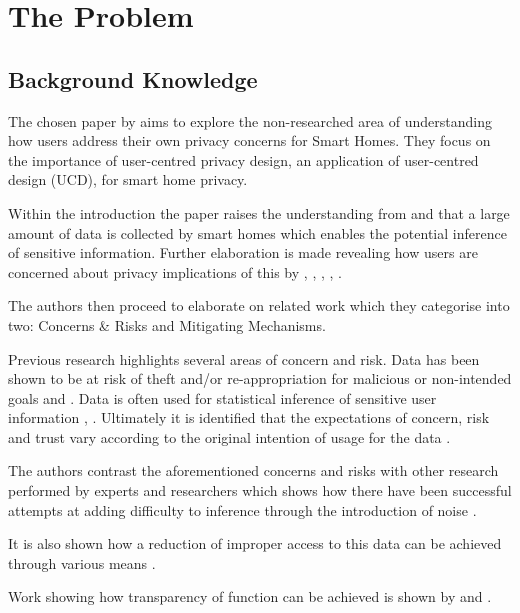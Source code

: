\section{The Problem}

\subsection{Background Knowledge}

The chosen paper by \textcite{Yao:2019:DMC:3290605.3300428} aims to explore the non-researched area of understanding how users address their own privacy concerns for Smart Homes. They focus on the importance of user-centred privacy design, an application of user-centred design (UCD), for smart home privacy. 

Within the introduction the paper raises the understanding from \textcite{9} and \textcite{28} that a large amount of data is collected by smart homes which enables the potential inference of sensitive information. Further elaboration is made revealing how users are concerned about privacy implications of this by \textcite{6}, \textcite{40}, \textcite{42}, \textcite{18}, \textcite{21}.

The authors then proceed to elaborate on related work which they categorise into two: Concerns \& Risks and Mitigating Mechanisms.

Previous research highlights several areas of concern and risk.
Data has been shown to be at risk of theft and/or re-appropriation for malicious or non-intended goals \parencite{3} \parencite{1} and \parencite{2}. Data is often used for statistical inference of sensitive user information \parencite{45}, \parencite{6} \parencite{42}. Ultimately it is identified that the expectations of concern, risk and trust vary according to the original intention of usage for the data \parencite{40} \parencite{43}.

The authors contrast the aforementioned concerns and risks with other research performed by experts and researchers which shows how there have been successful attempts at adding difficulty to inference through the introduction of noise \parencite{2} \parencite{11} \parencite{41} \parencite{39}.

It is also shown how a reduction of improper access to this data can be achieved through various means \parencite{29} \parencite{3} \parencite{8}.

Work showing how transparency of function can be achieved is shown by \textcite{10} and \textcite{26}.

